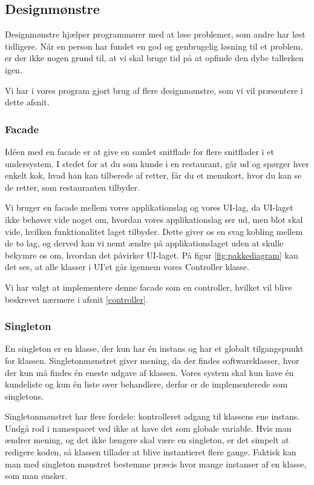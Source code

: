 \subsection{Designmønstre}
\label{designmoenstre}
Designmønstre hjælper programmører med at løse problemer, som andre har løst tidligere.
Når en person har fundet en god og genbrugelig løsning til et problem, er der ikke nogen grund til, at vi skal bruge tid på at opfinde den dybe tallerken igen.

Vi har i vores program gjort brug af flere designmønstre, som vi vil præsentere i dette afsnit.

\subsubsection{Facade}
\label{facade}

Idéen med en facade er at give en samlet snitflade for flere snitflader i et undersystem.
I stedet for at du som kunde i en restaurant, går ud og spørger hver enkelt kok, hvad han kan tilberede af retter, får du et menukort, hvor du kan se de retter, som restauranten tilbyder.

Vi bruger en facade mellem vores applikationslag og vores UI-lag, da UI-laget ikke behøver vide noget om, hvordan vores applikationslag ser ud, men blot skal vide, hvilken funktionalitet laget tilbyder.
Dette giver os en svag kobling mellem de to lag, og derved kan vi nemt ændre på applikationslaget uden at skulle bekymre os om, hvordan det påvirker UI-laget.\cite{gangoffour}
På figur \ref{fig:pakkediagram} kan det ses, at alle klasser i UI'et går igennem vores Controller klasse.

Vi har valgt at implementere denne facade som en controller, hvilket vil blive beskrevet nærmere i afsnit \ref{controller}.

\subsubsection{Singleton}
\label{singleton}

En singleton er en klasse, der kun har én instans og har et globalt tilgangspunkt for klassen.
Singletonmønstret giver mening, da der findes softwareklasser, hvor der kun må findes én eneste udgave af klassen.
Vores system skal kun have én kundeliste og kun én liste over behandlere, derfor er de implementerede som singletons.

Singletonmønstret har flere fordele: kontrolleret adgang til klassens ene instans.
Undgå rod i namespacet ved ikke at have det som globale variable.
Hvis man ændrer mening, og det ikke længere skal være en singleton, er det simpelt at redigere koden, så klassen tillader at blive instantieret flere gange. Faktisk kan man med singleton mønstret bestemme præcis hvor mange instanser af en klasse, som man ønsker.


